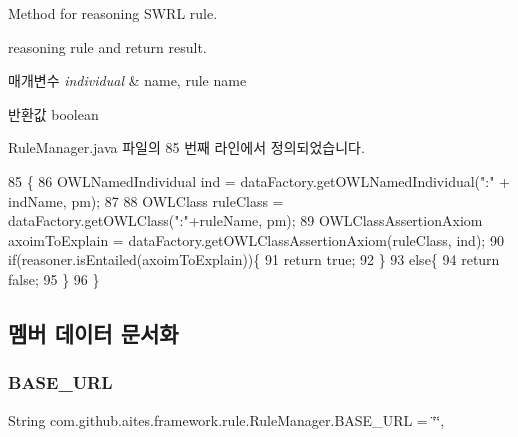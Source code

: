 Method for reasoning S\+W\+RL rule. 

reasoning rule and return result. 
\begin{DoxyParams}{매개변수}
{\em individual} & name, rule name \\
\hline
\end{DoxyParams}
\begin{DoxyReturn}{반환값}
boolean 
\end{DoxyReturn}


Rule\+Manager.\+java 파일의 85 번째 라인에서 정의되었습니다.


\begin{DoxyCode}
85                                                                  \{
86         OWLNamedIndividual ind = dataFactory.getOWLNamedIndividual(\textcolor{stringliteral}{":"} + indName, pm);
87                 
88         OWLClass ruleClass = dataFactory.getOWLClass(\textcolor{stringliteral}{":"}+ruleName, pm);
89         OWLClassAssertionAxiom axoimToExplain = dataFactory.getOWLClassAssertionAxiom(ruleClass, ind);
90         \textcolor{keywordflow}{if}(reasoner.isEntailed(axoimToExplain))\{
91             \textcolor{keywordflow}{return} \textcolor{keyword}{true};
92         \}
93         \textcolor{keywordflow}{else}\{
94             \textcolor{keywordflow}{return} \textcolor{keyword}{false};
95         \}
96     \}
\end{DoxyCode}


\subsection{멤버 데이터 문서화}
\mbox{\label{classcom_1_1github_1_1aites_1_1framework_1_1rule_1_1_rule_manager_ac1b9ec84300caaf946326a6c6aa479de}} 
\subsubsection{\texorpdfstring{B\+A\+S\+E\+\_\+\+U\+RL}{BASE\_URL}}
{\footnotesize\ttfamily String com.\+github.\+aites.\+framework.\+rule.\+Rule\+Manager.\+B\+A\+S\+E\+\_\+\+U\+RL = \char`\"{}\char`\"{}\hspace{0.3cm}{\ttfamily [static]}, {\ttfamily [private]}}



